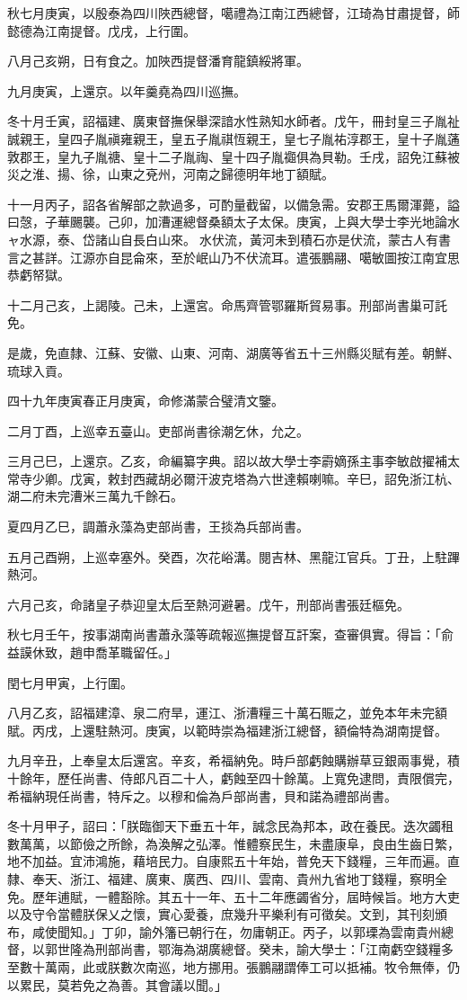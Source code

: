\begin{pinyinscope}
秋七月庚寅，以殷泰為四川陜西總督，噶禮為江南江西總督，江琦為甘肅提督，師懿德為江南提督。戊戌，上行圍。

八月己亥朔，日有食之。加陜西提督潘育龍鎮綏將軍。

九月庚寅，上還京。以年羹堯為四川巡撫。

冬十月壬寅，詔福建、廣東督撫保舉深諳水性熟知水師者。戊午，冊封皇三子胤祉誠親王，皇四子胤禛雍親王，皇五子胤祺恆親王，皇七子胤祐淳郡王，皇十子胤蓪敦郡王，皇九子胤禟、皇十二子胤祹、皇十四子胤禵俱為貝勒。壬戌，詔免江蘇被災之淮、揚、徐，山東之兗州，河南之歸德明年地丁額賦。

十一月丙子，詔各省解部之款過多，可酌量截留，以備急需。安郡王馬爾渾薨，謚曰愨，子華颺襲。己卯，加漕運總督桑額太子太保。庚寅，上與大學士李光地論水ャ水源，泰、岱諸山自長白山來。水伏流，黃河未到積石亦是伏流，蒙古人有書言之甚詳。江源亦自昆侖來，至於岷山乃不伏流耳。遣張鵬翮、噶敏圖按江南宜思恭虧帑獄。

十二月己亥，上謁陵。己未，上還宮。命馬齊管鄂羅斯貿易事。刑部尚書巢可託免。

是歲，免直隸、江蘇、安徽、山東、河南、湖廣等省五十三州縣災賦有差。朝鮮、琉球入貢。

四十九年庚寅春正月庚寅，命修滿蒙合璧清文鑒。

二月丁酉，上巡幸五臺山。吏部尚書徐潮乞休，允之。

三月己巳，上還京。乙亥，命編纂字典。詔以故大學士李霨嫡孫主事李敏啟擢補太常寺少卿。戊寅，敕封西藏胡必爾汗波克塔為六世達賴喇嘛。辛巳，詔免浙江杭、湖二府未完漕米三萬九千餘石。

夏四月乙巳，調蕭永藻為吏部尚書，王掞為兵部尚書。

五月己酉朔，上巡幸塞外。癸酉，次花峪溝。閱吉林、黑龍江官兵。丁丑，上駐蹕熱河。

六月己亥，命諸皇子恭迎皇太后至熱河避暑。戊午，刑部尚書張廷樞免。

秋七月壬午，按事湖南尚書蕭永藻等疏報巡撫提督互訐案，查審俱實。得旨：「俞益謨休致，趙申喬革職留任。」

閏七月甲寅，上行圍。

八月乙亥，詔福建漳、泉二府旱，運江、浙漕糧三十萬石賑之，並免本年未完額賦。丙戌，上還駐熱河。庚寅，以範時崇為福建浙江總督，額倫特為湖南提督。

九月辛丑，上奉皇太后還宮。辛亥，希福納免。時戶部虧蝕購辦草豆銀兩事覺，積十餘年，歷任尚書、侍郎凡百二十人，虧蝕至四十餘萬。上寬免逮問，責限償完，希福納現任尚書，特斥之。以穆和倫為戶部尚書，貝和諾為禮部尚書。

冬十月甲子，詔曰：「朕臨御天下垂五十年，誠念民為邦本，政在養民。迭次蠲租數萬萬，以節儉之所餘，為渙解之弘澤。惟體察民生，未盡康阜，良由生齒日繁，地不加益。宜沛鴻施，藉培民力。自康熙五十年始，普免天下錢糧，三年而遍。直隸、奉天、浙江、福建、廣東、廣西、四川、雲南、貴州九省地丁錢糧，察明全免。歷年逋賦，一體豁除。其五十一年、五十二年應蠲省分，屆時候旨。地方大吏以及守令當體朕保乂之懷，實心愛養，庶幾升平樂利有可徵矣。文到，其刊刻頒布，咸使聞知。」丁卯，諭外籓已朝行在，勿庸朝正。丙子，以郭瑮為雲南貴州總督，以郭世隆為刑部尚書，鄂海為湖廣總督。癸未，諭大學士：「江南虧空錢糧多至數十萬兩，此或朕數次南巡，地方挪用。張鵬翮謂俸工可以抵補。牧令無俸，仍以累民，莫若免之為善。其會議以聞。」


\end{pinyinscope}

